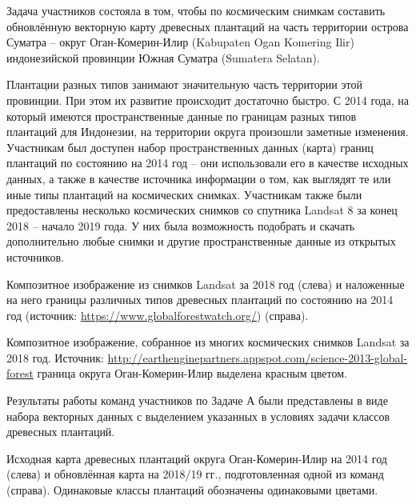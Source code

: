 \solutionSection

Задача участников состояла в том, чтобы по космическим снимкам составить обновлённую векторную карту древесных плантаций на часть территории острова Суматра – округ Оган-Комерин-Илир (Kabupaten Ogan Komering Ilir) индонезийской провинции Южная Суматра (Sumatera Selatan).

Плантации разных типов занимают значительную часть территории этой провинции. При этом их развитие происходит достаточно быстро. С 2014 года, на который имеются пространственные данные по границам разных типов плантаций для Индонезии, на территории округа произошли заметные изменения. Участникам был доступен набор пространственных данных (карта) границ плантаций по состоянию на 2014 год – они использовали его в качестве исходных данных, а также в качестве источника информации о том, как выглядят те или иные типы плантаций на космических снимках. Участникам также были предоставлены несколько космических снимков со спутника Landsat 8 за конец 2018 – начало 2019 года. У них была возможность подобрать и скачать дополнительно любые снимки и другие пространственные данные из открытых источников.


\begin{center}
    Композитное изображение из снимков Landsat за 2018 год (слева) и наложенные на него границы различных типов древесных плантаций по состоянию на 2014 год (источник: \url{https://www.globalforestwatch.org/}) (справа).
\end{center}


\begin{center}
    Композитное изображение, собранное из многих космических снимков Landsat за 2018 год. Источник: \url{http://earthenginepartners.appspot.com/science-2013-global-forest} граница округа Оган-Комерин-Илир выделена красным цветом.
\end{center}

Результаты работы команд участников по Задаче А были представлены в виде набора векторных данных с выделением указанных в условиях задачи классов древесных плантаций.


\begin{center}
    Исходная карта древесных плантаций округа Оган-Комерин-Илир на 2014 год (слева) и обновлённая карта на 2018/19 гг., подготовленная одной из команд (справа). Одинаковые классы плантаций обозначены одинаковыми цветами.
\end{center}

